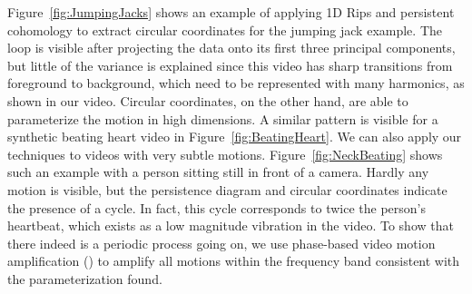 \documentclass[a4paper,UKenglish]{lipics-v2016}
\begin{document}
Figure~\ref{fig:JumpingJacks} shows an example of applying 1D Rips and persistent cohomology to extract circular coordinates for the jumping jack example.  The loop is visible after projecting the data onto its first three principal components, but little of the variance is explained since this video has sharp transitions from foreground to background, which need to be represented with many harmonics, as shown in our video.  Circular coordinates, on the other hand, are able to parameterize the motion in high dimensions.  A similar pattern is visible for a synthetic beating heart video in Figure~\ref{fig:BeatingHeart}.  We can also apply our techniques to videos with very subtle motions.  Figure~\ref{fig:NeckBeating} shows such an example with a person sitting still in front of a camera.  Hardly any motion is visible, but the persistence diagram and circular coordinates indicate the presence of a cycle.  In fact, this cycle corresponds to twice the person's heartbeat, which exists as a low magnitude vibration in the video.  To show that there indeed is a periodic process going on, we use phase-based video motion amplification (\cite{wadhwa2013phase}) to amplify all motions within the frequency band consistent with the parameterization found.


\end{document}
